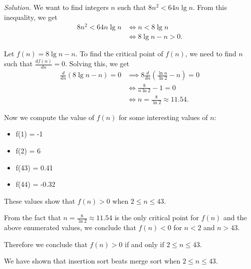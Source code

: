 \documentclass[oneside]{book}
\newenvironment{solution}{\textit{Solution.}}{\vspace{12pt}}
\begin{document}
\begin{solution}
We want to find integers \( n \) such that \( 8n^2 < 64 n \lg n \). From
this inequality, we get
\begin{align*}
8n^2 < 64 n \lg n & \iff n < 8 \lg n \\
                  & \iff 8 \lg n - n > 0.
\end{align*}

Let \( f(n) = 8 \lg n - n \). To find the critical point of \( f(n) \),
we need to find \( n \) such that \( \frac{d f(n)}{dn} = 0 \). Solving
this, we get
\begin{align*}
\frac{d}{dn} (8 \lg n - n) = 0
& \implies 8 \frac{d}{dn} \left( \frac{\ln n}{\ln 2} - n \right)= 0 \\
& \iff \frac{8}{n \ln 2} - 1 = 0 \\
& \iff n = \frac{8}{\ln 2} \approx 11.54.
\end{align*}

Now we compute the value of \( f(n) \) for some interesting values of
\( n \):
\begin{itemize}
\item f(1) = -1
\item f(2) = 6
\item f(43) = 0.41
\item f(44) = -0.32
\end{itemize}

These values show that \( f(n) > 0 \) when \( 2 \leq n \leq 43 \).

From the fact that \( n = \frac{8}{\ln 2} \approx 11.54 \) is the only
critical point for \( f(n) \) and the above enumerated values, we
conclude that \( f(n) < 0 \) for \( n < 2 \) and \( n > 43 \).

Therefore we conclude that \( f(n) > 0 \) if and only if
\( 2 \leq n \leq 43 \).

We have shown that insertion sort beats merge sort when
\( 2 \leq n \leq 43 \).
\end{solution}
\end{document}
